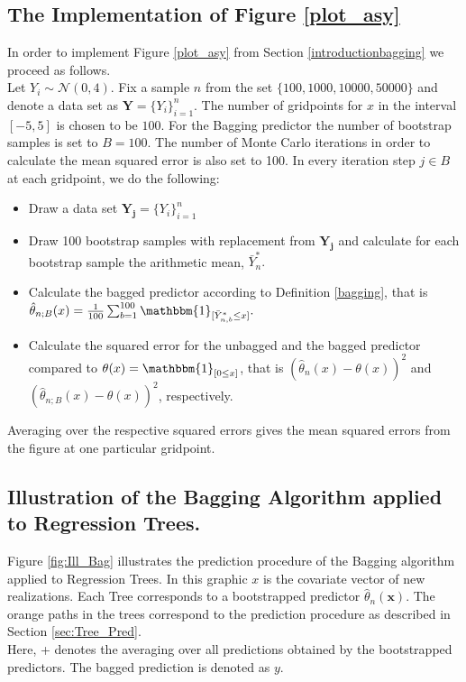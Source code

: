 \subsection{The Implementation of Figure \ref{plot_asy}}\label{sec:App_FiniteSample}
In order to implement Figure \ref{plot_asy} from Section \ref{introductionbagging} we proceed as follows. \\
Let $Y_i \sim \mathcal{N}(0,4)$. Fix a sample $n$ from the set $\{100, 1000, 10000, 50000\}$ and denote a data set as $\mathbf{Y}=\{Y_i\}_{i=1}^n$.
The number of gridpoints for $x$ in the interval $[-5,5]$ is chosen to be $100$.
For the Bagging predictor the number of bootstrap samples is set to $B=100$.
The number of Monte Carlo iterations in order to calculate the mean squared error is also set to 100.
In every iteration step $j \in B$ at each gridpoint, we do the following:
\begin{itemize}
\item Draw a data set $\mathbf{Y_j}=\{Y_i\}_{i=1}^n$
\item Draw 100 bootstrap samples with replacement from $\mathbf{Y_j}$ and calculate for each bootstrap sample the arithmetic mean, $\bar{Y}_{n}^{*}.$ 
\item Calculate the bagged predictor according to Definition \ref{bagging}, that is $\hat{\theta}_{n;B}(x) = \frac{1}{100}\sum_{b=1}^{100}\mathbbm{1}_{[\bar{Y}_{n,b}^{*} \leq x]}.$
\item Calculate the squared error for the unbagged and the bagged predictor compared to $\theta(x)=\mathbbm{1}_{[0 \leq x]}$, that is $(\hat{\theta}_{n}(x)-\theta(x))^2$ and $(\hat{\theta}_{n;B}(x)-\theta(x))^2$, respectively.
\end{itemize}
Averaging over the respective squared errors gives the mean squared errors from the figure at one particular gridpoint.


\subsection{Illustration of the Bagging Algorithm applied to Regression Trees.}
\label{App:Ill_Bag}
Figure \ref{fig:Ill_Bag} illustrates the prediction procedure of the Bagging algorithm applied to Regression Trees. In this graphic $x$ is the covariate vector of new realizations. 
Each Tree corresponds to a bootstrapped predictor $\hat{\theta}_n(\mathbf{x})$. 
The orange paths in the trees correspond to the prediction procedure as described in Section \ref{sec:Tree_Pred}.\\
Here, + denotes the averaging over all predictions obtained by the bootstrapped predictors. The bagged prediction is denoted as $y$.

